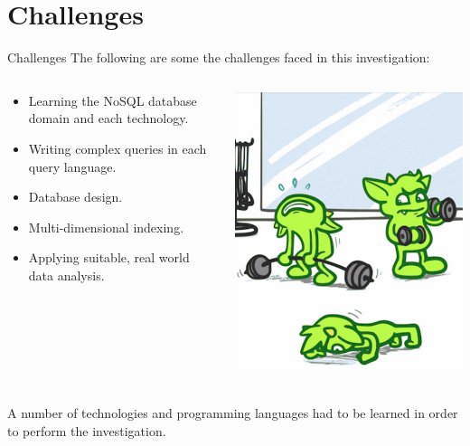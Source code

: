 \section{Challenges}

\begin{frame}{Challenges}
    The following are some the challenges faced in this investigation:
    \vfill
    \begin{columns}
        \begin{column}{.6\textwidth}
            \begin{itemize}
                \item Learning the NoSQL database domain and each technology.
                \item Writing complex queries in each query language.
                \item Database design.
                \item Multi-dimensional indexing.
                \item Applying suitable, real world data analysis.
            \end{itemize}
            \end{column}%
            \hfill%
            \begin{column}{.39\textwidth}
            \centering
            \includegraphics[width=0.7\columnwidth]{img/gremlin-images/gremlin-gym-crop.png}
        \end{column}%
    \end{columns}
    \vfill
    A number of technologies and programming languages had to be learned in order to perform the investigation.
    \vfill
    \parnotes
\end{frame}

